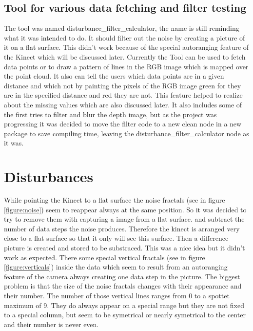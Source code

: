 \subsection{Tool for various data fetching and filter testing}
The tool was named disturbance\_filter\_calculator, the name is still reminding what it was intended to do. It should
filter out the noise by creating a picture of it on a flat surface. This didn't work because of the special autoranging
feature of the Kinect which will be discussed later. Currently the Tool can be used to fetch data points or to
draw a pattern of lines in the RGB image which is mapped over the point cloud. It also can tell the users which data points
are in a given distance and which not by painting the pixels of the RGB image green for they are in the specified distance
and red they are not. This feature helped to realize about the missing values which are also discussed later. It also includes
some of the first tries to filter and blur the depth image, but as the project was progressing it was decided to move the 
filter code to a new clean node in a new package to save compiling time, leaving the disturbance\_filter\_calculator 
node as it was.


\section{Disturbances}
While pointing the Kinect to a flat surface the noise fractals (see in figure \vref{figure:noise}) 
seem to reappear always at the same position. So it was decided to try to remove them with capturing a image from a flat surface.
and subtract the number of data steps the noise produces. Therefore the kinect is arranged very close to a flat surface 
so that it only will see this surface. Then a difference picture is created and stored to be substraced. 
This was a nice idea but it didn't work as expected. There some special vertical fractals (see in figure \vref{figure:verticals}) 
inside the data which seem to result from an autoranging feature of the camera always creating one data step in the picture. 
The biggest problem is that the size of the noise fractals changes with their appearance and their number. The number of
those vertical lines ranges from 0 to a spottet maximum of 9. They do always appear on a special range 
but they are not fixed to a special column, but seem to be symetrical or nearly symetrical to the center 
and their number is never even. 

